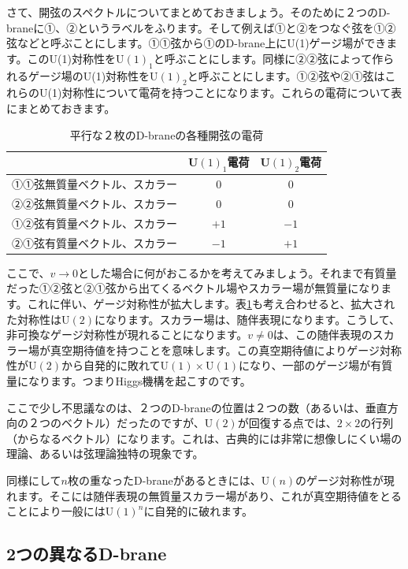 \documentclass[report,paper=a4, fontsize=12pt, line_length=16cm, number_of_lines=34,dvipdfmx]{jlreq}
\numberwithin{equation}{chapter}
\numberwithin{equation}{section}
\begin{document}
さて、開弦のスペクトルについてまとめておきましょう。そのために２つのD-braneに①、②というラベルをふります。そして例えば①と②をつなぐ弦を①②弦などと呼ぶことにします。①①弦から①のD-brane上にU(1)ゲージ場ができます。このU(1)対称性をU$(1)_1$と呼ぶことにします。同様に②②弦によって作られるゲージ場のU(1)対称性をU$(1)_2$と呼ぶことにします。①②弦や②①弦はこれらのU(1)対称性について電荷を持つことになります。これらの電荷について表にまとめておきます。
\begin{table}
  \centering
  \begin{tabular}{|c|c|c|}\hline
    & U$(1)_1$電荷 & U$(1)_2$電荷\\ \hline
    ①①弦無質量ベクトル、スカラー & 0 & 0 \\ \hline
    ②②弦無質量ベクトル、スカラー & 0 & 0 \\ \hline
    ①②弦有質量ベクトル、スカラー & $+1$ & $-1$ \\ \hline
    ②①弦有質量ベクトル、スカラー & $-1$ & $+1$ \\ \hline
  \end{tabular}
  \caption{平行な２枚のD-braneの各種開弦の電荷}
  \label{tab:charges}
\end{table}

ここで、$v\to 0$とした場合に何がおこるかを考えてみましょう。それまで有質量だった①②弦と②①弦から出てくるベクトル場やスカラー場が無質量になります。これに伴い、ゲージ対称性が拡大します。表\ref{tab:charges}も考え合わせると、拡大された対称性はU$(2)$になります。スカラー場は、随伴表現になります。こうして、非可換なゲージ対称性が現れることになります。$v\ne 0$は、この随伴表現のスカラー場が真空期待値を持つことを意味します。この真空期待値によりゲージ対称性がU$(2)$から自発的に敗れてU$(1)\times $U$(1)$になり、一部のゲージ場が有質量になります。つまりHiggs機構を起こすのです。

ここで少し不思議なのは、２つのD-braneの位置は２つの数（あるいは、垂直方向の２つのベクトル）だったのですが、U$(2)$が回復する点では、$2\times 2$の行列（からなるベクトル）になります。これは、古典的には非常に想像しにくい場の理論、あるいは弦理論独特の現象です。

同様にして$n$枚の重なったD-braneがあるときには、U$(n)$のゲージ対称性が現れます。そこには随伴表現の無質量スカラー場があり、これが真空期待値をとることにより一般にはU$(1)^n$に自発的に破れます。

\subsection{2つの異なるD-brane}
\end{document}

